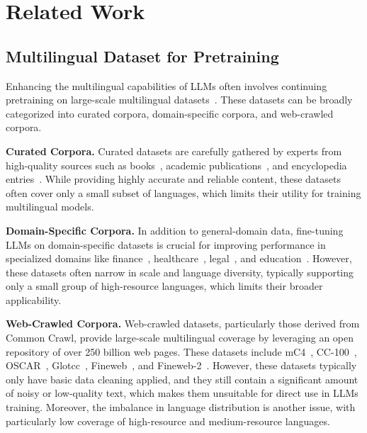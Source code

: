 \section{Related Work}
\label{sec:related_work}
\subsection{Multilingual Dataset for Pretraining}
\label{sec:related_multi_dataset}
Enhancing the multilingual capabilities of LLMs often involves continuing pretraining on large-scale multilingual datasets~\cite{lin2024mala,ji2024emma}.
These datasets can be broadly categorized into curated corpora, domain-specific corpora, and web-crawled corpora.

\noindent\textbf{Curated Corpora.}
Curated datasets are carefully gathered by experts from high-quality sources such as books~\cite{laurenccon2022bigscience}, academic publications~\cite{clement2019use}, and encyclopedia entries~\cite{brown2011wikipedia,lehmann2015dbpedia,kuo2024wikibench}.
While providing highly accurate and reliable content, these datasets often cover only a small subset of languages, which limits their utility for training multilingual models.

\noindent\textbf{Domain-Specific Corpora.}
In addition to general-domain data, fine-tuning LLMs on domain-specific datasets is crucial for improving performance in specialized domains like finance~\cite{zhang2023xuanyuan}, healthcare~\cite{wu2024pmc}, legal~\cite{colombo2024saullm}, and education~\cite{xu2024large,lozhkov2024fineweb-edu}.
However, these datasets often narrow in scale and language diversity, typically supporting only a small group of high-resource languages, which limits their broader applicability.

\noindent\textbf{Web-Crawled Corpora.}
Web-crawled datasets, particularly those derived from Common Crawl, provide large-scale multilingual coverage by leveraging an open repository of over 250 billion web pages.
These datasets include mC4~\cite{raffel2020exploring}, CC-100~\cite{conneau-etal-2020-unsupervised}, OSCAR~\cite{abadji2022towards}, Glotcc~\cite{kargaran2024glotcc}, Fineweb~\cite{penedo2024fineweb}, and Fineweb-2~\cite{penedo2024fineweb-2}.
However, these datasets typically only have basic data cleaning applied, and they still contain a significant amount of noisy or low-quality text, which makes them unsuitable for direct use in LLMs training.
Moreover, the imbalance in language distribution is another issue, with particularly low coverage of high-resource and medium-resource languages.

